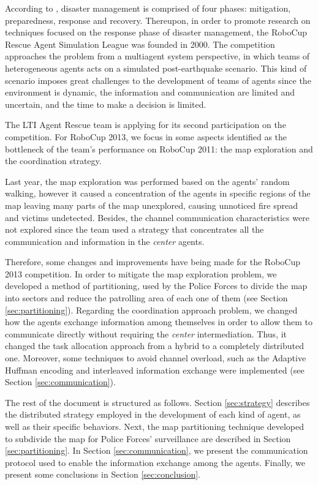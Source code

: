 \documentclass{llncs}
\begin{document}
According to \cite{blanchardEtAl2007}, disaster management is comprised of four phases: mitigation, preparedness, response and recovery. Thereupon, in order to promote research on techniques focused on the response phase of disaster management, the RoboCup Rescue Agent Simulation League \cite{kitanoEtAl1999} was founded in 2000. The competition approaches the problem from a multiagent system perspective, in which teams of heterogeneous agents acts on a simulated post-earthquake scenario. This kind of scenario imposes great challenges to the development of teams of agents since the environment is dynamic, the information and communication are limited and uncertain, and the time to make a decision is limited.

The LTI Agent Rescue team is applying for its second participation on the competition. For RoboCup 2013, we focus in some aspects identified as the bottleneck of the team's performance on RoboCup 2011: the map exploration and the coordination strategy.

Last year, the map exploration was performed based on the agents' random walking, however it caused a concentration of the agents in specific regions of the map leaving many parts of the map unexplored, causing unnoticed fire spread and victims undetected. Besides, the channel communication characteristics were not explored since the team used a strategy that concentrates all the communication and information in the {\it center} agents.

Therefore, some changes and improvements have being made for the RoboCup 2013 competition. In order to mitigate the map exploration problem, we developed a method of partitioning, used by the Police Forces to divide the map into sectors and reduce the patrolling area of each one of them (see Section \ref{sec:partitioning}). Regarding the coordination approach problem, we changed how the agents exchange information among themselves in order to allow them to communicate directly without requiring the {\it center} intermediation. Thus, it changed the task allocation approach from a hybrid to a completely distributed one. Moreover, some techniques to avoid channel overload, such as the Adaptive Huffman encoding \cite{huffman1952,vitter1987} and interleaved information exchange were implemented (see Section \ref{sec:communication}).

The rest of the document is structured as follows. Section \ref{sec:strategy} describes the distributed strategy employed in the development of each kind of agent, as well as their specific behaviors. Next, the map partitioning technique developed to subdivide the map for Police Forces' surveillance are described in Section \ref{sec:partitioning}. In Section \ref{sec:communication}, we present the communication protocol used to enable the information exchange among the agents. Finally, we present some conclusions in Section \ref{sec:conclusion}.
\end{document}

